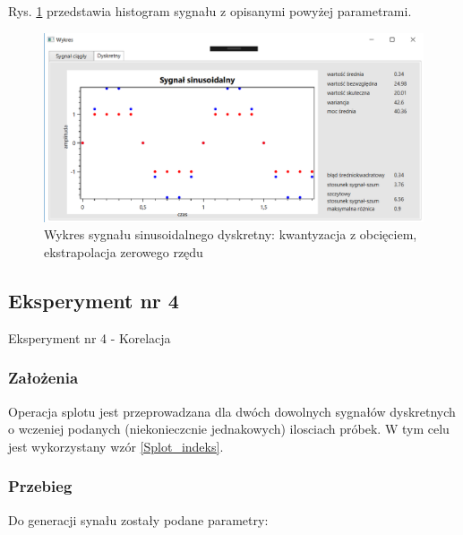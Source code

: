 \documentclass[12pt]{article}
\begin{document}
\newpage
Rys. \ref{Histogram dla wyników eksperymentu trzeciego} przedstawia histogram sygnału z opisanymi powyżej parametrami. 
\begin{figure}[h!]
 \centering
 \includegraphics[width=12.3cm]{SinKwantObcrEkstA2T2f10H2t1D.PNG}
 \vspace{-0.3cm}
 \caption{Wykres sygnału sinusoidalnego dyskretny: kwantyzacja z obcięciem, ekstrapolacja zerowego rzędu}
 \label{Histogram dla wyników eksperymentu trzeciego}
\end{figure}


\subsection{Eksperyment nr 4}

Eksperyment nr 4 - Korelacja\\

\subsubsection{Założenia}
Operacja splotu jest przeprowadzana dla dwóch dowolnych sygnałów dyskretnych o wczeniej podanych (niekonieczcnie jednakowych) ilosciach próbek. W tym celu jest wykorzystany wzór \ref{Splot_indeks}.

\subsubsection{Przebieg}
Do generacji synału zostały podane parametry:
\end{document}
